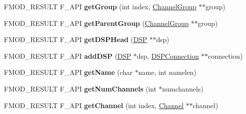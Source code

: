 \begin{DoxyCompactItemize}
\item 
F\+M\+O\+D\+\_\+\+R\+E\+S\+U\+LT F\+\_\+\+A\+PI {\bfseries get\+Group} (int index, \hyperlink{class_f_m_o_d_1_1_channel_group}{Channel\+Group} $\ast$$\ast$group)\hypertarget{class_f_m_o_d_1_1_channel_group_a5ac9853233cf3fa367022f1219db26ff}{}\label{class_f_m_o_d_1_1_channel_group_a5ac9853233cf3fa367022f1219db26ff}

\item 
F\+M\+O\+D\+\_\+\+R\+E\+S\+U\+LT F\+\_\+\+A\+PI {\bfseries get\+Parent\+Group} (\hyperlink{class_f_m_o_d_1_1_channel_group}{Channel\+Group} $\ast$$\ast$group)\hypertarget{class_f_m_o_d_1_1_channel_group_ab953a5c6bf1dc0d25bed4af7c0653bee}{}\label{class_f_m_o_d_1_1_channel_group_ab953a5c6bf1dc0d25bed4af7c0653bee}

\item 
F\+M\+O\+D\+\_\+\+R\+E\+S\+U\+LT F\+\_\+\+A\+PI {\bfseries get\+D\+S\+P\+Head} (\hyperlink{class_f_m_o_d_1_1_d_s_p}{D\+SP} $\ast$$\ast$dsp)\hypertarget{class_f_m_o_d_1_1_channel_group_abe6e293fe4bb90eb1547b0a038c83ac7}{}\label{class_f_m_o_d_1_1_channel_group_abe6e293fe4bb90eb1547b0a038c83ac7}

\item 
F\+M\+O\+D\+\_\+\+R\+E\+S\+U\+LT F\+\_\+\+A\+PI {\bfseries add\+D\+SP} (\hyperlink{class_f_m_o_d_1_1_d_s_p}{D\+SP} $\ast$dsp, \hyperlink{class_f_m_o_d_1_1_d_s_p_connection}{D\+S\+P\+Connection} $\ast$$\ast$connection)\hypertarget{class_f_m_o_d_1_1_channel_group_a71b05630f62cd15a889777f29478cda2}{}\label{class_f_m_o_d_1_1_channel_group_a71b05630f62cd15a889777f29478cda2}

\item 
F\+M\+O\+D\+\_\+\+R\+E\+S\+U\+LT F\+\_\+\+A\+PI {\bfseries get\+Name} (char $\ast$name, int namelen)\hypertarget{class_f_m_o_d_1_1_channel_group_a152e3dfbbde9a125c002845e8ffd9231}{}\label{class_f_m_o_d_1_1_channel_group_a152e3dfbbde9a125c002845e8ffd9231}

\item 
F\+M\+O\+D\+\_\+\+R\+E\+S\+U\+LT F\+\_\+\+A\+PI {\bfseries get\+Num\+Channels} (int $\ast$numchannels)\hypertarget{class_f_m_o_d_1_1_channel_group_a31d5e3b8424b09069841b40633dee207}{}\label{class_f_m_o_d_1_1_channel_group_a31d5e3b8424b09069841b40633dee207}

\item 
F\+M\+O\+D\+\_\+\+R\+E\+S\+U\+LT F\+\_\+\+A\+PI {\bfseries get\+Channel} (int index, \hyperlink{class_f_m_o_d_1_1_channel}{Channel} $\ast$$\ast$channel)\hypertarget{class_f_m_o_d_1_1_channel_group_aadda005170e610a32c03473499b94823}{}\label{class_f_m_o_d_1_1_channel_group_aadda005170e610a32c03473499b94823}


\end{DoxyCompactItemize}
